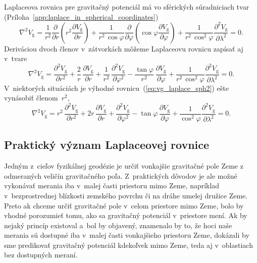 \documentclass[a4paper, 12pt]{book}
\newcommand{\gidx}{\mathrm g}
\begin{document}
Laplaceova rovnica pre gravitačný potenciál má vo sférických súradniciach tvar 
(Príloha~\ref{app:laplace_in_spherical_coordinates})
%
\begin{equation}
\label{eq:vg_laplace_sph}
\nabla^2 V_\gidx = \frac{1}{r^2} \frac{\partial}{\partial r} \left( r^2
\frac{\partial V_\gidx}{\partial r} \right) + \frac{1}{r^2 \, \cos\varphi}
\frac{\partial}{\partial \varphi} \left( \cos\varphi \frac{\partial
V_\gidx}{\partial \varphi} \right) + \frac{1}{r^2 \,
\cos^2\varphi}\frac{\partial^2 V_\gidx}{\partial \lambda^2} = 0{.}
\end{equation}
%
Deriváciou dvoch členov v~zátvorkách môžeme Laplaceovu rovnicu zapísať aj 
v~tvare
%
\begin{equation}
\label{eq:vg_laplace_sph2}
\nabla^2 V_\gidx = \frac{\partial^2 V_\gidx}{\partial r^2} + \frac{2}{r} \, 
\frac{\partial V_\gidx}{\partial r} + \frac{1}{r^2} \, \frac{\partial^2 
V_\gidx}{\partial \varphi^2} - \frac{\tan\varphi}{r^2} \, \frac{\partial 
V_\gidx}{\partial \varphi} + \frac{1}{r^2 \,
\cos^2\varphi}\frac{\partial^2 V_\gidx}{\partial \lambda^2} = 0{.}
\end{equation}
%
V~niektorých situáciách je výhodné rovnicu~(\ref{eq:vg_laplace_sph2}) ešte 
vynásobiť členom~$r^2$,
%
\begin{equation}
\label{eq:vg_laplace_sph3}
\nabla^2 V_\gidx = r^2 \, \frac{\partial^2 V_\gidx}{\partial r^2} + 2r \, 
\frac{\partial V_\gidx}{\partial r} + \frac{\partial^2 V_\gidx}{\partial 
\varphi^2} - \tan\varphi \, \frac{\partial V_\gidx}{\partial \varphi} 
+ \frac{1}{\cos^2\varphi}\frac{\partial^2 V_\gidx}{\partial \lambda^2} = 0{.}
\end{equation}


\subsection{Praktický význam Laplaceovej rovnice}
\label{sec:meaning_of_laplace_equation_in_practice}

Jedným z~cieľov fyzikálnej geodézie je určiť vonkajšie gravitačné pole Zeme 
z odmeraných veličín gravitačného poľa.  Z~praktických dôvodov je ale možné 
vykonávať merania iba v~malej časti priestoru mimo Zeme, napríklad 
v~bezprostrednej blízkosti zemského povrchu či na dráhe umelej družice Zeme.  
Preto ak chceme určiť gravitačné pole v~celom priestore mimo Zeme, bolo by 
vhodné porozumieť tomu, ako sa gravitačný potenciál v~priestore mení.  Ak by 
nejaký princíp existoval a~bol by objavený, znamenalo by to, že hoci naše 
merania sú dostupné iba v~malej časti vonkajšieho priestoru Zeme, dokázali by 
sme predikovať gravitačný potenciál kdekoľvek mimo Zeme, teda aj v~oblastiach 
bez dostupných meraní.
\end{document}
